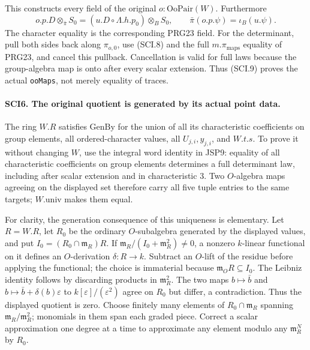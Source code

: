This constructs every field of the original \(o:\mathrm{OoPair}(W)\).
Furthermore
\[
 o.p.D\otimes_{\bar\pi} S_0
       =(u.D\circ\Lambda.h.p_0)\otimes_B S_0,\qquad
 \bar\pi(o.p.\psi)=\iota_B(u.\psi).                       \tag{SCI.9}
\]
The character equality is the corresponding PRG23 field. For
the determinant, pull both sides back along \(\pi_{o,0}\),
use (SCI.8) and the full \(m.\pi_{\mathrm{maps}}\) equality
of PRG23, and cancel this pullback. Cancellation is valid for
full laws because the group-algebra map is onto after every
scalar extension. Thus (SCI.9) proves the actual
\texttt{ooMaps}, not merely equality of traces.

\paragraph{SCI6. The original quotient is generated by its actual point data.}
\label{claim:SCI6}
The ring \(W.R\) satisfies \(\mathrm{GenBy}\) for the union
of all its characteristic coefficients on group elements,
all ordered-character values, all \(U_{j,i},y_{j,i}\), and
\(W.t.s\). To prove it without changing \(W\), use the
integral word identity in JSP9: equality of all characteristic
coefficients on group elements determines a full determinant
law, including after scalar extension and in characteristic
\(3\). Two \(O\)-algebra maps agreeing on the displayed set
therefore carry all five tuple entries to the same targets;
\(W.\mathrm{univ}\) makes them equal.

For clarity, the generation consequence of this uniqueness is
elementary. Let \(R=W.R\), let \(R_0\) be the ordinary
\(O\)-subalgebra generated by the displayed values, and put
\(I_0=(R_0\cap\mathfrak m_R)R\). If
\(\mathfrak m_R/(I_0+\mathfrak m_R^2)\ne0\), a nonzero
\(k\)-linear functional on it defines an \(O\)-derivation
\(\delta:R\to k\). Subtract an \(O\)-lift of the residue
before applying the functional; the choice is immaterial because
\(\mathfrak m_OR\subseteq I_0\). The Leibniz identity follows
by discarding products in \(\mathfrak m_R^2\). The two maps
\(b\mapsto\bar b\) and
\(b\mapsto\bar b+\delta(b)\varepsilon\) to
\(k[\varepsilon]/(\varepsilon^2)\) agree on \(R_0\) but
differ, a contradiction. Thus the displayed quotient is zero.
Choose finitely many elements of \(R_0\cap\mathfrak m_R\)
spanning \(\mathfrak m_R/\mathfrak m_R^2\); monomials in
them span each graded piece. Correct a scalar approximation
one degree at a time to approximate any element modulo any
\(\mathfrak m_R^N\) by \(R_0\).

